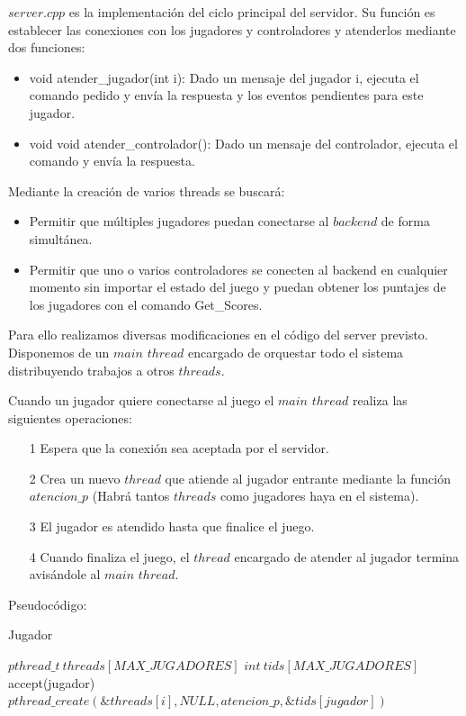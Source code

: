 $server.cpp$ es la implementación del ciclo principal del servidor. Su función es establecer las conexiones con los jugadores y controladores y atenderlos mediante dos funciones:

\begin{itemize}
	\item void atender\_jugador(int i): Dado un mensaje del jugador i, ejecuta el comando pedido y envía la respuesta y los eventos pendientes para este jugador.
	\item void void atender\_controlador(): Dado un mensaje del controlador, ejecuta el comando y envía la respuesta.
\end{itemize}

Mediante la creación de varios threads se buscará:

\begin{itemize}
	\item Permitir que múltiples jugadores puedan conectarse al $backend$ de forma simultánea.
	\item Permitir que uno o varios controladores se conecten al backend en cualquier momento sin importar el estado del juego y puedan obtener los puntajes de los jugadores con el comando Get\_Scores.
\end{itemize}

Para ello realizamos diversas modificaciones en el código del server previsto. Disponemos de un $main$ $thread$ encargado de orquestar todo el sistema distribuyendo trabajos a otros $threads$.

Cuando un jugador quiere conectarse al juego el $main$ $thread$ realiza las siguientes operaciones:

\begin{itemize}
	\item[1] Espera que la conexión sea aceptada por el servidor.
	\item[2] Crea un nuevo $thread$ que atiende al jugador entrante mediante la función $atencion\_p$ (Habrá tantos $threads$ como jugadores haya en el sistema).
	\item[3] El jugador es atendido hasta que finalice el juego.
	\item[4] Cuando finaliza el juego, el $thread$ encargado de atender al jugador termina avisándole al $main$ $thread$.
\end{itemize}

Pseudocódigo:

\begin{algorithm}[H]
\caption{Jugador}\label{ej1}
\begin{algorithmic}[1]
	\State $pthread\_t \ threads[MAX\_JUGADORES]$ 
	\State $int \ tids[MAX\_JUGADORES]$
		\State accept(jugador)
		\State $pthread\_create(\&threads[i],NULL,atencion\_p,\&tids[jugador])$
	\EndFor
\EndProcedure
\end{algorithmic}
\end{algorithm}

